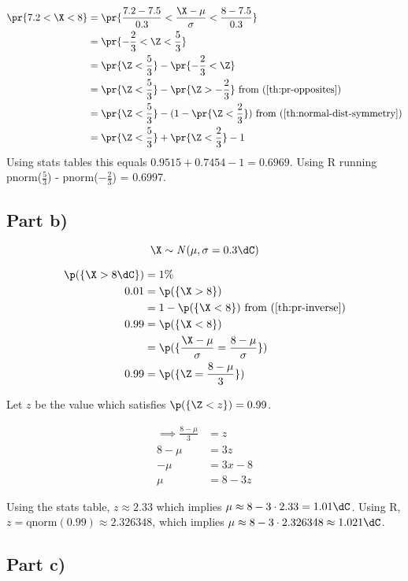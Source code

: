 \begin{align*}
\pr{7.2 < \X < 8} &= \pr{\frac{7.2 - 7.5}{0.3} < \frac{\X - \mu}{\sigma} < \frac{8 - 7.5}{0.3}} \\
&= \pr{-\frac{2}{3} < \Z < \frac{5}{3}} \\
&= \pr{\Z < \frac{5}{3}} - \pr{-\frac{2}{3} < \Z} \\
&= \pr{\Z < \frac{5}{3}} - \pr{\Z > -\frac{2}{3}}
\text{	from (\ref{th:pr-opposites})} \\
&= \pr{\Z < \frac{5}{3}} - (1 - \pr{\Z < \frac{2}{3}})
\text{	from (\ref{th:normal-dist-symmetry})} \\
&= \pr{\Z < \frac{5}{3}} + \pr{\Z < \frac{2}{3}} - 1
\end{align*}
Using stats tables this equals $0.9515 + 0.7454 - 1 = 0.6969$.
Using R running pnorm($\frac{5}{3}$) - pnorm($-\frac{2}{3}$) = 0.6997.

\subsection{Part b)}

\[
\X \sim \mathit{N}(\mu, \sigma = 0.3 \dC)
\]

\begin{align*}
\p(\{ \X > 8\dC \}) &= 1\% \\
0.01 &= \p(\{ \X > 8 \}) \\
&= 1 - \p(\{ \X < 8 \})
\text{	from (\ref{th:pr-inverse})} \\
0.99 &= \p(\{ \X < 8 \}) \\
&= \p(\{ \frac{\X - \mu}{\sigma} = \frac{8 - \mu}{\sigma}\}) \\
0.99 &= \p(\{ \Z = \frac{8 - \mu}{3}\}) \\
\end{align*}

Let $z$ be the value which satisfies $\p(\{ \Z < z \}) = 0.99$.

\begin{align*}
\implies \frac{8 - \mu}{3} &= z \\
8 - \mu &= 3z \\
-\mu &= 3x - 8 \\
\mu &= 8 - 3z
\end{align*}

Using the stats table, $z \approx 2.33$ which implies $\mu \approx 8 - 3 \cdot 2.33 = 1.01\dC$.
Using R, $z = \text{qnorm}(0.99) \approx 2.326348$, which implies $\mu \approx 8 - 3 \cdot 2.326348 \approx 1.021\dC$.

\subsection{Part c)}

